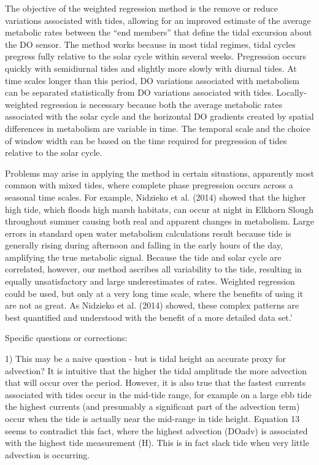 \documentclass[letterpaper,12pt]{article}\usepackage[]{graphicx}\usepackage[]{color}
\begin{document}
{The objective of the weighted regression method is the remove or reduce variations associated with tides, allowing for an improved estimate of the average metabolic rates between the ``end members'' that define the tidal excursion about the DO sensor.  The method works because in most tidal regimes, tidal cycles pregress fully relative to the solar cycle within several weeks.  Pregression occurs quickly with semidiurnal tides and slightly more slowly with diurnal tides.  At time scales longer than this period, DO variations associated with metabolism can be separated statistically from DO variations associated with tides.  Locally-weighted regression is necessary because both the average metabolic rates associated with the solar cycle and the horizontal DO gradients created by spatial differences in metabolism are variable in time.  The temporal scale and the choice of window width can be based on the time required for pregression of tides relative to the solar cycle.

Problems may arise in applying the method in certain situations, apparently most common with mixed tides, where complete phase pregression occurs across a seasonal time scales.  For example, Nidzieko et al. (2014) showed that the higher high tide, which floods high marsh habitats, can occur at night in Elkhorn Slough throughout summer causing both real and apparent changes in metabolism.  Large errors in standard open water metabolism calculations result because tide is generally rising during afternoon and falling in the early hours of the day, amplifying the true metabolic signal.  Because the tide and solar cycle are correlated, however, our method ascribes all variability to the tide, resulting in equally unsatisfactory and large underestimates of rates.  Weighted regression could be used, but only at a very long time scale, where the benefits of using it are not as great.  As Nidzieko et al. (2014) showed, these complex patterns are best quantified and understood with the benefit of a more detailed data set.'
}

Specific questions or corrections:

1) This may be a naive question -  but is tidal height an accurate proxy for advection? It is intuitive that the higher the tidal amplitude the more advection that will occur over the period. However, it is also true that the fastest currents associated with tides occur in the mid-tide range, for example on a large ebb tide the highest currents (and presumably a significant part of the advection term) occur when the tide is actually near the mid-range in tide height. Equation 13 seems to contradict this fact, where the highest advection (DOadv) is associated with the highest tide measurement (H). This is in fact slack tide when very little advection is occurring.
\end{document}
